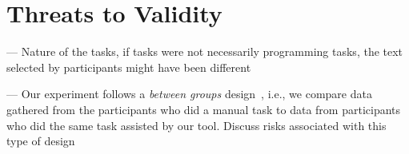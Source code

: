 
\clearpage

\section{Threats to Validity}
\label{cp6:threats}


--- Nature of the tasks, if tasks were not necessarily programming tasks, the text selected by participants might have been different


--- Our experiment follows a \textit{between groups} design~\cite{Lazar2017-cp3}, i.e., we compare data gathered from the participants who did a manual task 
 to data from participants who did the same task assisted by our tool. Discuss risks associated with this type of design
